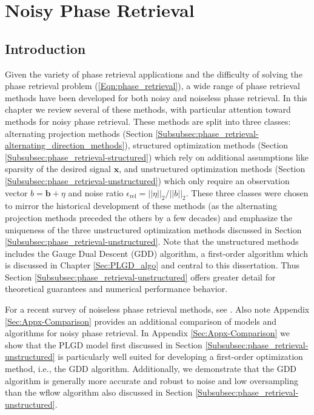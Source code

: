 \chapter{Noisy Phase Retrieval} 	\label{Sec:phase_retrieval}




\section{Introduction}  	\label{Subsec:phase_retrieval-intro}


Given the variety of phase retrieval applications and the difficulty of solving the phase retrieval problem (\ref{Eqn:phase_retrieval}), a wide range of phase retrieval methods have been developed for both noisy and noiseless phase retrieval. 
In this chapter we review several of these methods, with particular attention toward methods for noisy phase retrieval.  
These methods are split into three classes: alternating projection methods (Section \ref{Subsubsec:phase_retrieval-alternating_direction_methods}), structured optimization methods (Section \ref{Subsubsec:phase_retrieval-structured}) which rely on additional assumptions like sparsity of the desired signal $\mathbf{x}$, and unstructured optimization methods (Section \ref{Subsubsec:phase_retrieval-unstructured}) which only require an observation vector $b = \mathbf{b} + \eta$ and noise ratio $\epsilon_{\text{rel}} = ||\eta||_2 / ||b||_2$.  
These three classes were chosen to mirror the historical development of these methods (as the alternating projection methods preceded the others by a few decades) and emphasize the uniqueness of the three unstructured optimization methods discussed in Section \ref{Subsubsec:phase_retrieval-unstructured}.
Note that the unstructured methods includes the Gauge Dual Descent (GDD) algorithm, a first-order algorithm which is discussed in Chapter \ref{Sec:PLGD_algo} and central to this dissertation.
Thus Section \ref{Subsubsec:phase_retrieval-unstructured} offers greater detail for theoretical guarantees and numerical performance behavior.



For a recent survey of noiseless phase retrieval methods, see \cite{DBLP:journals/corr/JaganathanEH15a}.
Also note Appendix \ref{Sec:Appx-Comparison} provides an additional comparison of models and algorithms for noisy phase retrieval.
In Appendix \ref{Sec:Appx-Comparison} we show that the PLGD model first discussed in Section \ref{Subsubsec:phase_retrieval-unstructured} is particularly well suited for developing a first-order optimization method, i.e., the GDD algorithm.
Additionally, we demonstrate that the GDD algorithm is generally more accurate and robust to noise and low oversampling than the wflow algorithm also discussed in Section \ref{Subsubsec:phase_retrieval-unstructured}.













